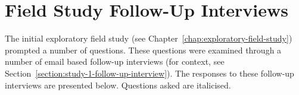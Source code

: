 \begin{center}
\end{center}

\chapter{Field Study Follow-Up Interviews}
\label{appendix:field-study-follow-up-interviews}

The initial exploratory field study (see Chapter~\ref{chap:exploratory-field-study}) prompted a number of questions. These questions were examined through a number of email based follow-up interviews (for context, see Section~\ref{section:study-1-follow-up-interview}). The responses to these follow-up interviews are presented below. Questions asked are italicised.



